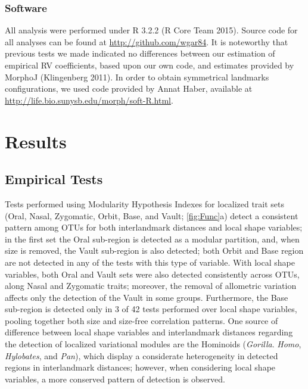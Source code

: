 \documentclass[12pt,]{article}
\begin{document}
\subsubsection{Software}\label{software}

All analysis were performed under R 3.2.2 (R Core Team 2015). Source
code for all analyses can be found at \url{http://github.com/wgar84}. It
is noteworthy that previous tests we made indicated no differences
between our estimation of empirical RV coefficients, based upon our own
code, and estimates provided by MorphoJ (Klingenberg 2011). In order to
obtain symmetrical landmarks configurations, we used code provided by
Annat Haber, available at
\url{http://life.bio.sunysb.edu/morph/soft-R.html}.

\section{Results}\label{results}

\subsection{Empirical Tests}\label{empirical-tests}

Tests performed using Modularity Hypothesis Indexes for localized trait
sets (Oral, Nasal, Zygomatic, Orbit, Base, and Vault;
\autoref{fig:Func}a) detect a consistent pattern among OTUs for both
interlandmark distances and local shape variables; in the first set the
Oral sub-region is detected as a modular partition, and, when size is
removed, the Vault sub-region is also detected; both Orbit and Base
region are not detected in any of the tests with this type of variable.
With local shape variables, both Oral and Vault sets were also detected
consistently across OTUs, along Nasal and Zygomatic traits; moreover,
the removal of allometric variation affects only the detection of the
Vault in some groups. Furthermore, the Base sub-region is detected only
in 3 of 42 tests performed over local shape variables, pooling together
both size and size-free correlation patterns. One source of difference
between local shape variables and interlandmark distances regarding the
detection of localized variational modules are the Hominoids
(\emph{Gorilla}. \emph{Homo}, \emph{Hylobates}, and \emph{Pan}), which
display a considerate heterogeneity in detected regions in interlandmark
distances; however, when considering local shape variables, a more
conserved pattern of detection is observed.
\end{document}
